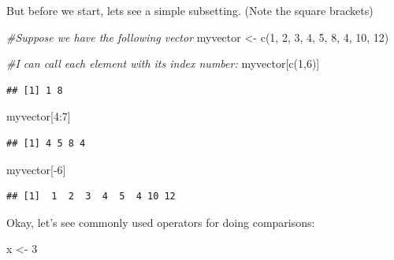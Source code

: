 \documentclass[
]{book}
\newenvironment{Shaded}{\begin{snugshade}}{\end{snugshade}}
\newcommand{\CommentTok}[1]{\textcolor[rgb]{0.56,0.35,0.01}{\textit{#1}}}
\newcommand{\DecValTok}[1]{\textcolor[rgb]{0.00,0.00,0.81}{#1}}
\newcommand{\FunctionTok}[1]{\textcolor[rgb]{0.00,0.00,0.00}{#1}}
\newcommand{\NormalTok}[1]{#1}
\newcommand{\OtherTok}[1]{\textcolor[rgb]{0.56,0.35,0.01}{#1}}
\newcommand{\SpecialCharTok}[1]{\textcolor[rgb]{0.00,0.00,0.00}{#1}}
\theoremstyle{definition}
\theoremstyle{definition}
\theoremstyle{definition}
\theoremstyle{definition}
\theoremstyle{remark}
\begin{document}
But before we start, lets see a simple subsetting. (Note the square brackets)

\begin{Shaded}
\begin{Highlighting}[]
\CommentTok{\#Suppose we have the following vector}
\NormalTok{myvector }\OtherTok{\textless{}{-}} \FunctionTok{c}\NormalTok{(}\DecValTok{1}\NormalTok{, }\DecValTok{2}\NormalTok{, }\DecValTok{3}\NormalTok{, }\DecValTok{4}\NormalTok{, }\DecValTok{5}\NormalTok{, }\DecValTok{8}\NormalTok{, }\DecValTok{4}\NormalTok{, }\DecValTok{10}\NormalTok{, }\DecValTok{12}\NormalTok{)}

\CommentTok{\#I can call each element with its index number:}
\NormalTok{myvector[}\FunctionTok{c}\NormalTok{(}\DecValTok{1}\NormalTok{,}\DecValTok{6}\NormalTok{)]}
\end{Highlighting}
\end{Shaded}

\begin{verbatim}
## [1] 1 8
\end{verbatim}

\begin{Shaded}
\begin{Highlighting}[]
\NormalTok{myvector[}\DecValTok{4}\SpecialCharTok{:}\DecValTok{7}\NormalTok{]}
\end{Highlighting}
\end{Shaded}

\begin{verbatim}
## [1] 4 5 8 4
\end{verbatim}

\begin{Shaded}
\begin{Highlighting}[]
\NormalTok{myvector[}\SpecialCharTok{{-}}\DecValTok{6}\NormalTok{]}
\end{Highlighting}
\end{Shaded}

\begin{verbatim}
## [1]  1  2  3  4  5  4 10 12
\end{verbatim}

Okay, let's see commonly used operators for doing comparisons:

\begin{Shaded}
\begin{Highlighting}[]
\NormalTok{x }\OtherTok{\textless{}{-}} \DecValTok{3}
\end{Highlighting}
\end{Shaded}
\end{document}
